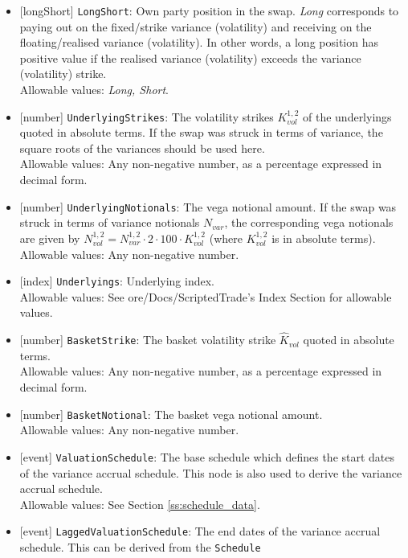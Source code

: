 \begin{itemize}
  \item{}[longShort] \lstinline!LongShort!: Own party position in the swap. \emph{Long} corresponds to paying out on the
  fixed/strike variance (volatility) and receiving on the floating/realised variance (volatility). In other words,
  a long position has positive value if the realised variance (volatility) exceeds the variance (volatility)
  strike. \\
  Allowable values: \emph{Long, Short}.
  \item{}[number] \lstinline!UnderlyingStrikes!: The volatility strikes $K^{1,2}_{vol}$ of the underlyings quoted in
  absolute terms. If the swap was struck in terms of variance, the square roots of the variances should be used here. \\
  Allowable values: Any non-negative number, as a percentage expressed in decimal form.
  \item{}[number] \lstinline!UnderlyingNotionals!: The vega notional amount. If the swap was struck in terms of variance notionals
  $N_{var}$, the corresponding vega notionals are given by $N^{1,2}_{vol} = N^{1,2}_{var} \cdot 2 \cdot 100 \cdot K^{1,2}_{vol}$
  (where $K^{1,2}_{vol}$ is in absolute terms). \\
  Allowable values: Any non-negative number.
  \item{}[index] \lstinline!Underlyings!: Underlying index. \\
  Allowable values: See ore/Docs/ScriptedTrade's Index Section for allowable values.
  \item{}[number] \lstinline!BasketStrike!: The basket volatility strike $\hat{K}_{vol}$ quoted in absolute terms. \\
  Allowable values: Any non-negative number, as a percentage expressed in decimal form.
  \item{}[number] \lstinline!BasketNotional!: The basket vega notional amount. \\
  Allowable values: Any non-negative number.
  \item{}[event] \lstinline!ValuationSchedule!: The base schedule which defines the start dates of the variance accrual schedule. This node is
  also used to derive the variance accrual schedule. \\
  Allowable values: See Section \ref{ss:schedule_data}.
  \item{}[event] \lstinline!LaggedValuationSchedule!: The end dates of the variance accrual schedule. This can be derived from the \lstinline!Schedule!

\end{itemize}
